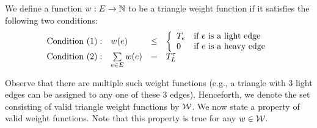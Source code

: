
\begin{definition}\label{Definition: Weight Function}
    We define a function ${w} : {E} \rightarrow {\mathbb{N}}$ to be a triangle weight function if it satisfies the following two conditions:
\[
\begin{array}{llll}
\mbox{Condition (1)}: & w(e) & \leq & 
\left\{
\begin{array}{ll}
T_e & \text{if $e$ is a light edge}\\
0 &\text{if $e$ is a heavy edge} 
\end{array} 
\right. 
\\
\mbox{Condition (2)}: & \sum\limits_{e \in E} w(e) & = & T^{\tau}_{L} 
\end{array}
\]


\end{definition}

Observe that there are multiple such weight functions (e.g., a triangle with 3 light edges can be assigned to any one of these 3 edges). Henceforth, we denote the set consisting of valid triangle weight functions by $\mathcal{W}$. We now state a property of valid weight functions. Note that this property is true for any $w \in \mathcal{W}$.

